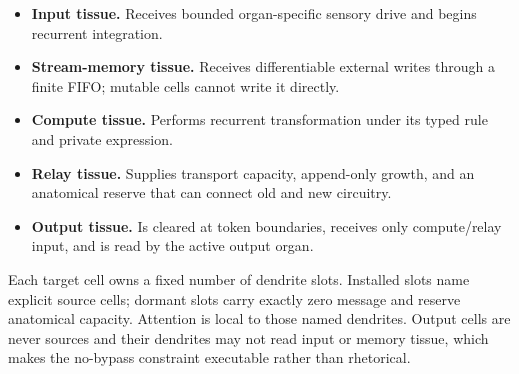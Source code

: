 \documentclass[11pt]{article}
\begin{document}
\begin{itemize}
  \item \textbf{Input tissue.} Receives bounded organ-specific sensory drive and begins recurrent
        integration.
  \item \textbf{Stream-memory tissue.} Receives differentiable external writes through a finite
        FIFO; mutable cells cannot write it directly.
  \item \textbf{Compute tissue.} Performs recurrent transformation under its typed rule and
        private expression.
  \item \textbf{Relay tissue.} Supplies transport capacity, append-only growth, and an anatomical
        reserve that can connect old and new circuitry.
  \item \textbf{Output tissue.} Is cleared at token boundaries, receives only compute/relay input,
        and is read by the active output organ.
\end{itemize}

Each target cell owns a fixed number of dendrite slots. Installed slots name explicit
source cells; dormant slots carry exactly zero message and reserve anatomical capacity.
Attention is local to those named dendrites. Output cells are never sources and their
dendrites may not read input or memory tissue, which makes the no-bypass constraint
executable rather than rhetorical.
\end{document}
